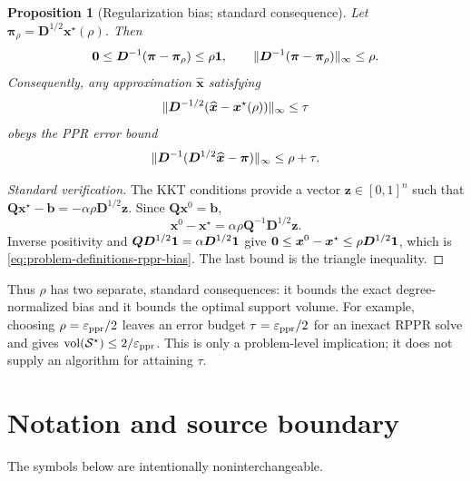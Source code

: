 \documentclass[11pt]{article}
\newtheorem{proposition}[theorem]{Proposition}
\theoremstyle{definition}
\theoremstyle{remark}
\theoremstyle{plain}
\begin{document}
\begin{proposition}[Regularization bias; standard consequence]
\label{prop:problem-definitions-rppr-bias}
Let $\bm{\pi}_\rho=\bm{D}^{1/2}\bm{x}^\star(\rho)$. Then
\begin{equation}
    \bm{0}
    \leq \bm{D}^{-1}(\bm{\pi}-\bm{\pi}_\rho)
    \leq \rho\mathbf{1},
    \qquad
    \lVert\bm{D}^{-1}(\bm{\pi}-\bm{\pi}_\rho)\rVert_\infty\leq\rho.
    \label{eq:problem-definitions-rppr-bias}
\end{equation}
Consequently, any approximation $\widehat{\bm{x}}$ satisfying
\begin{equation}
    \lVert\bm{D}^{-1/2}
      (\widehat{\bm{x}}-\bm{x}^\star(\rho))\rVert_\infty\leq\tau
    \label{eq:problem-definitions-rppr-optimization-error}
\end{equation}
obeys the PPR error bound
\begin{equation}
    \lVert\bm{D}^{-1}
      (\bm{D}^{1/2}\widehat{\bm{x}}-\bm{\pi})\rVert_\infty
    \leq\rho+\tau.
    \label{eq:problem-definitions-rppr-total-error}
\end{equation}
\end{proposition}

\begin{proof}[Standard verification]
The KKT conditions provide a vector $\bm{z}\in[0,1]^n$ such that
$\bm{Q}\bm{x}^\star-\bm{b}
=-\alpha\rho\bm{D}^{1/2}\bm{z}$. Since
$\bm{Q}\bm{x}^0=\bm{b}$,
\[
    \bm{x}^0-\bm{x}^\star
    =\alpha\rho\bm{Q}^{-1}\bm{D}^{1/2}\bm{z}.
\]
Inverse positivity and
$\bm{Q}\bm{D}^{1/2}\mathbf{1}=\alpha\bm{D}^{1/2}\mathbf{1}$ give
$\bm{0}\leq\bm{x}^0-\bm{x}^\star
\leq\rho\bm{D}^{1/2}\mathbf{1}$, which is
\cref{eq:problem-definitions-rppr-bias}.  The last bound is the triangle
inequality.
\end{proof}

Thus $\rho$ has two separate, standard consequences: it bounds the exact
degree-normalized bias and it bounds the optimal support volume.  For example,
choosing $\rho=\varepsilon_{\mathrm{ppr}}/2$ leaves an error budget $\tau=\varepsilon_{\mathrm{ppr}}/2$ for an
inexact RPPR solve and gives
$\operatorname{vol}(\mathcal{S}^\star)\leq2/\varepsilon_{\mathrm{ppr}}$. This is only a problem-level
implication; it does not supply an algorithm for attaining $\tau$.

\section{Notation and source boundary}
\label{sec:problem-definitions-source-boundary}

The symbols below are intentionally noninterchangeable.
\end{document}
